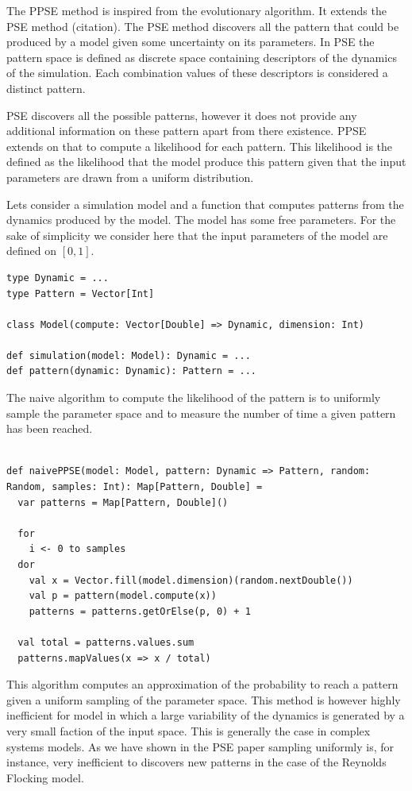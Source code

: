 \documentclass[10pt,a4paper]{article}
\theoremstyle{definition}
\theoremstyle{remark}
\begin{document}
The PPSE method is inspired from the evolutionary algorithm. It extends the PSE method (citation). The PSE method discovers all the pattern that could be produced by a model given some uncertainty on its parameters. In PSE the pattern space is defined as discrete space containing descriptors of the dynamics of the simulation. Each combination values of these descriptors is considered a distinct pattern.

PSE discovers all the possible patterns, however it does not provide any additional information on these pattern apart from there existence. PPSE extends on that to compute a likelihood for each pattern. This likelihood is the defined as the likelihood that the model produce this pattern given that the input parameters are drawn from a uniform distribution.

Lets consider a simulation model and a function that computes patterns from the dynamics produced by the model. The model has some free parameters. For the sake of simplicity we consider here that the input parameters of the model are defined on $[0, 1]$.

\begin{lstlisting}[caption={Model and pattern signatures},label={lst:pattern}]
type Dynamic = ...
type Pattern = Vector[Int]

class Model(compute: Vector[Double] => Dynamic, dimension: Int)

def simulation(model: Model): Dynamic = ...
def pattern(dynamic: Dynamic): Pattern = ...
\end{lstlisting}

The naive algorithm to compute the likelihood of the pattern is to uniformly sample the parameter space and to measure the number of time a given pattern has been reached. 

\begin{lstlisting}[caption={Naive PPSE},label={lst:pattern}]

def naivePPSE(model: Model, pattern: Dynamic => Pattern, random: Random, samples: Int): Map[Pattern, Double] = 
  var patterns = Map[Pattern, Double]()
  
  for 
    i <- 0 to samples
  dor
    val x = Vector.fill(model.dimension)(random.nextDouble())
    val p = pattern(model.compute(x))
    patterns = patterns.getOrElse(p, 0) + 1
  
  val total = patterns.values.sum
  patterns.mapValues(x => x / total)
\end{lstlisting}

This algorithm computes an approximation of the probability to reach a pattern given a uniform sampling of the parameter space. This method is however highly inefficient for model in which a large variability of the dynamics is generated by a very small faction of the input space. This is generally the case in complex systems models. As we have shown in the PSE paper sampling uniformly is, for instance, very inefficient to discovers new patterns in the case of the Reynolds Flocking model.
\end{document}

